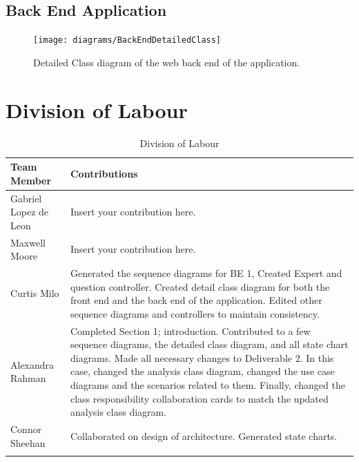 \documentclass[titlepage]{article}
\begin{document}
\subsection{Back End Application}
\begin{figure}[H]
\texttt{[image: diagrams/BackEndDetailedClass]}
\caption{Detailed Class diagram of the web back end of the application.}\label{sd:web_application}
\end{figure}

\pagebreak
\appendix
\section{Division of Labour}
\label{sec:division_of_labour}

\begin{longtable}{| p{} | p{} |}
			\hline
			\textbf {Team Member} & \textbf{Contributions}\\ 
			\hline
			Gabriel Lopez de Leon & Insert your contribution here.
			\\
			\hline
			Maxwell Moore & Insert your contribution here.
			\\
			\hline
			Curtis Milo & Generated the sequence diagrams for BE 1, Created Expert and question controller. Created detail class diagram for both the front end and the back end of the application. Edited other sequence diagrams and controllers to maintain consistency.
			\\ 
			\hline
			Alexandra Rahman & Completed Section 1; introduction. Contributed to a few sequence diagrams, the detailed class diagram, and all state chart diagrams. Made all necessary changes to Deliverable 2. In this case, changed the analysis class diagram, changed the use case diagrams and the scenarios related to them. Finally, changed the class responsibility collaboration cards to match the updated analysis class diagram.
			\\
			\hline
			Connor Sheehan & Collaborated on design of architecture. Generated state charts.
			\\
			\hline
			
			\caption{Division of Labour}
	\end{longtable}
\end{document}

